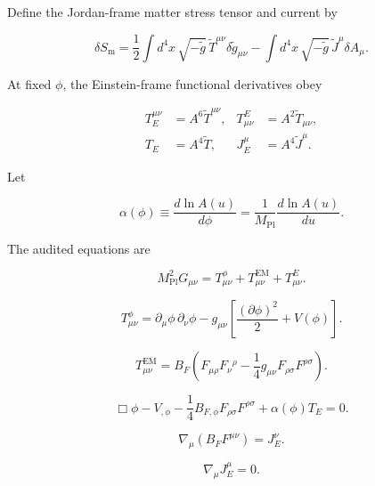 \documentclass[
  american,
  11pt,
  letterpaper,
]{article}
\begin{document}
Define the Jordan-frame matter stress tensor and current by

\begin{equation}
\delta S_{\mathrm m}
=\frac{1}{2}\int d^4x\,\sqrt{-\widetilde g}\,
\widetilde T^{\mu\nu}\delta\widetilde g_{\mu\nu}
-\int d^4x\,\sqrt{-\widetilde g}\,
\widetilde J^\mu\delta A_\mu.
\tag{8}
\end{equation}

At fixed \(\phi\), the Einstein-frame functional derivatives obey

\[
\begin{aligned}
T_E^{\mu\nu}&=A^6\widetilde T^{\mu\nu}, &
T^E_{\mu\nu}&=A^2\widetilde T_{\mu\nu},\\
T_E&=A^4\widetilde T, & J_E^\mu&=A^4\widetilde J^\mu.
\end{aligned}
\tag{9}
\]

Let

\begin{equation}
\alpha(\phi)\equiv\frac{d\ln A(u)}{d\phi}
=\frac{1}{M_{\mathrm{Pl}}}\frac{d\ln A(u)}{du}.
\tag{10}
\end{equation}

The audited equations are

\begin{equation}
M_{\mathrm{Pl}}^2G_{\mu\nu}=T^\phi_{\mu\nu}+T^{\mathrm{EM}}_{\mu\nu}+T^E_{\mu\nu}.
\tag{11}
\end{equation}

\begin{equation}
T^\phi_{\mu\nu}=\partial_\mu\phi\,\partial_\nu\phi
-g_{\mu\nu}\left[\frac{(\partial\phi)^2}{2}+V(\phi)\right].
\tag{12}
\end{equation}

\begin{equation}
T^{\mathrm{EM}}_{\mu\nu}=B_F\left(F_{\mu\rho}F_\nu{}^\rho
-\frac{1}{4}g_{\mu\nu}F_{\rho\sigma}F^{\rho\sigma}\right).
\tag{13}
\end{equation}

\begin{equation}
\Box\phi-V_{,\phi}-\frac{1}{4}B_{F,\phi}F_{\rho\sigma}F^{\rho\sigma}
+\alpha(\phi)T_E=0.
\tag{14}
\end{equation}

\begin{equation}
\nabla_\mu\!\left(B_FF^{\mu\nu}\right)=J_E^\nu.
\tag{15}
\end{equation}

\begin{equation}
\nabla_\mu J_E^\mu=0.
\tag{16}
\end{equation}
\end{document}
